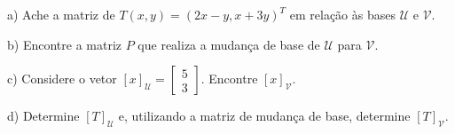 a) Ache a matriz de $T(x, y) = (2x - y, x + 3y)^T$ em relação às bases $\mathcal{U}$ e $\mathcal{V}$.

b) Encontre a matriz $P$ que realiza a mudança de base de $\mathcal{U}$ para $\mathcal{V}$.

c) Considere o vetor $[x]_\mathcal{U} = \begin{bmatrix}
	5 \\
	3
\end{bmatrix}$. Encontre $[x]_\mathcal{V}$.

d) Determine $[T]_\mathcal{U}$ e, utilizando a matriz de mudança de base, determine $[T]_\mathcal{V}$.